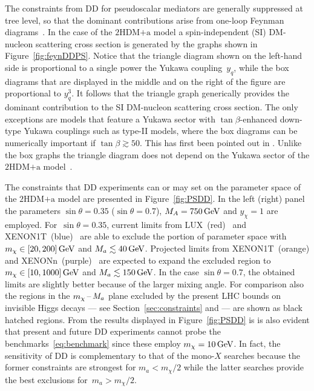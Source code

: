 \documentclass[a4paper, 11pt,notoc]{article}
\newcommand{\hdma}{\ensuremath{\textrm{2HDM+a}}\xspace}
\begin{document}
The constraints from DD for pseudoscalar mediators are generally suppressed at tree level, so that the dominant contributions arise from one-loop Feynman diagrams~\cite{Ipek:2014gua,Arcadi:2017wqi,Sanderson:2018lmj}. In the case of the \hdma model a spin-independent (SI) DM-nucleon  scattering cross section is generated by the graphs shown in Figure~\ref{fig:feynDDPS}. Notice that the triangle diagram shown on the left-hand side  is proportional to a single power the Yukawa coupling~$y_q$, while the box diagrams that are displayed in the middle and on the right of the figure  are proportional to $y_q^3$. It follows that the triangle graph generically provides the dominant contribution to the SI DM-nucleon  scattering cross section. The only exceptions are models that feature a Yukawa sector with  $\tan \beta$-enhanced down-type Yukawa couplings such as type-II models, where the box diagrams can be numerically important if $\tan\beta\gtrsim50$. This has first been pointed out in \cite{Ipek:2014gua}. Unlike the box graphs the triangle diagram does not depend on the Yukawa sector of the \hdma model~\cite{Arcadi:2017wqi,Sanderson:2018lmj}.

The constraints that DD experiments can or may set on the parameter space of the \hdma model are presented in Figure~\ref{fig:PSDD}. In the left (right) panel the parameters $\sin \theta = 0.35$ ($\sin \theta = 0.7$), $M_A = 750 \, {\rm GeV}$ and $y_\chi = 1$ are employed. For~$\sin \theta = 0.35$,  current limits from LUX~(red)~\cite{Akerib:2016vxi} and  XENON1T~(blue)~\cite{Aprile:2017iyp} are able to exclude the portion of parameter space with $m_\chi \in [20, 200 ]\, {\rm GeV}$ and $M_a \lesssim 40 \, {\rm GeV}$. Projected limits from XENON1T~(orange) and XENONn~(purple)~\cite{Aprile:2015uzo} are expected to expand the excluded region to $m_\chi \in [10, 1000 ]\, {\rm GeV}$ and $M_a \lesssim 150 \, {\rm GeV}$. In the case $\sin \theta = 0.7$, the obtained limits are slightly better because of the larger mixing angle. For comparison also the regions in the $m_\chi \hspace{0.5mm}$--$\hspace{0.5mm} M_a$ plane excluded by the present  LHC bounds on invisible Higgs decays --- see Section~\ref{sec:constraints} and \cite{Bauer:2017ota} --- are shown as black hatched regions.  From the results displayed in Figure~\ref{fig:PSDD} is is also evident that present and future DD experiments cannot probe the benchmarks~\eqref{eq:benchmark} since these employ $m_\chi = 10 \, {\rm GeV}$. In fact, the sensitivity of DD is complementary to that of the mono-$X$ searches because the former constraints are strongest for $m_a < m_\chi/2$ while the latter searches provide the best exclusions for~$m_a > m_\chi/2$. 
\end{document}

